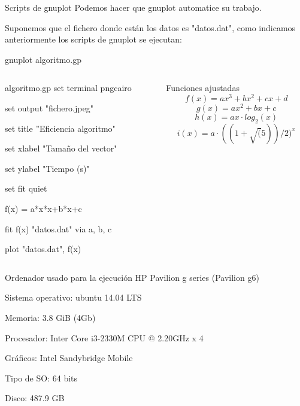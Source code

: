\documentclass[compress]{beamer}
\begin{document}
\begin{frame}
	\begin{block}{Scripts de gnuplot}
		Podemos hacer que gnuplot automatice su trabajo.
		
		Suponemos que el fichero donde están los datos es "datos.dat", como indicamos anteriormente los scripts de gnuplot se ejecutan:
		
		\hspace{2cm} gnuplot algoritmo.gp
	\end{block}
	\pause
	
	\begin{columns}
	\begin{column}{5cm}
	\begin{exampleblock}{algoritmo.gp}
	set terminal pngcairo
	
	set output "fichero.jpeg"
	
	set title ''Eficiencia algoritmo"
	
	set xlabel "Tamaño del vector"

	set ylabel "Tiempo (s)"

	set fit quiet

	f(x) = a*x*x+b*x+c

	fit f(x) "datos.dat" via a, b, c

	plot "datos.dat", f(x)
	\end{exampleblock}
	\end{column}
	\pause
	
	\begin{column}{5cm}
	\begin{block}{Funciones ajustadas}
		\[f(x)=ax^3 + bx^2 + cx + d\]
		\[g(x)=ax^2 + bx + c\]
		\[h(x)=ax\cdot log_2(x)\]
		\[i(x)=a \cdot ((1+ \sqrt(5))/2)^x\]
	\end{block}
	\end{column}
	
	\end{columns}
\end{frame}

\begin{frame}
	\begin{alertblock}{Ordenador usado para la ejecuci\'on}
	HP Pavilion g series (Pavilion g6)

	Sistema operativo: ubuntu 14.04 LTS

	Memoria: 3.8 GiB (4Gb)

	Procesador: Inter Core i3-2330M CPU @ 2.20GHz x 4

	Gráficos: Intel Sandybridge Mobile

	Tipo de SO: 64 bits

	Disco: 487.9 GB	
	\end{alertblock}
\end{frame}
\end{document}
